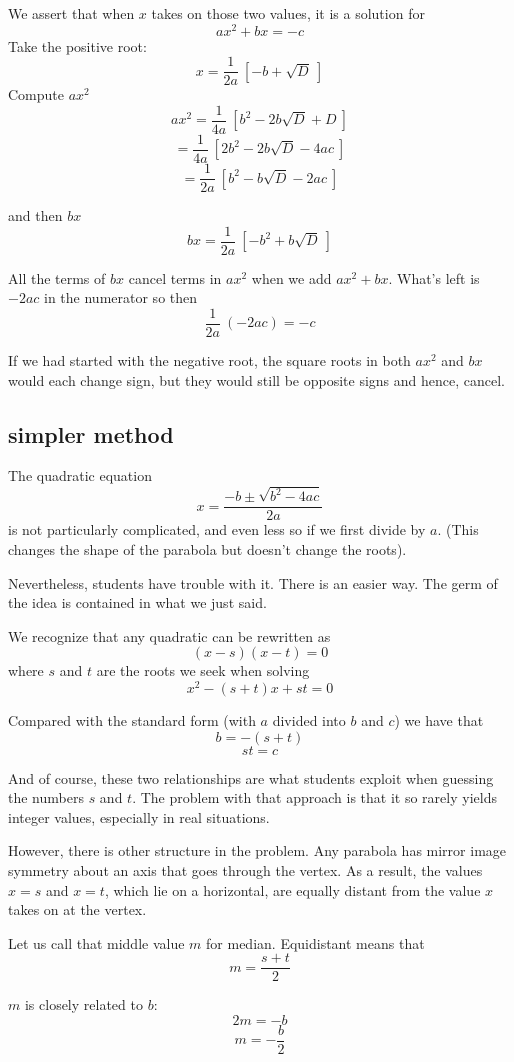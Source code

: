 \documentclass[11pt, oneside]{article}
\begin{document}
We assert that when $x$ takes on those two values, it is a solution for
\[ ax^2 + bx = -c \]
Take the positive root:
\[ x = \frac{1}{2a} \ [ -b + \sqrt{D} \ ] \]
Compute $ax^2$
\[ ax^2 = \frac{1}{4a} \ [ b^2 - 2 b \sqrt{D} + D \ ] \]
\[ = \frac{1}{4a} \ [ 2b^2 - 2b \sqrt{D} - 4ac \ ] \]
\[ =  \frac{1}{2a} \ [ b^2 - b \sqrt{D} - 2ac \ ] \]

and then $bx$
\[ bx = \frac{1}{2a} \ [ -b^2 + b \sqrt{D} \ ] \]

All the terms of $bx$ cancel terms in $ax^2$ when we add $ax^2 + bx$.  What's left is $- 2ac$ in the numerator so then
\[ \frac{1}{2a} \ (- 2ac) = -c \]

If we had started with the negative root, the square roots in both $ax^2$ and $bx$ would each change sign, but they would still be opposite signs and hence, cancel.

\subsection*{simpler method}
The quadratic equation
\[ x =  \frac{-b \pm \sqrt{b^2 - 4ac}}{2a}  \]
is not particularly complicated, and even less so if we first divide by $a$.  (This changes the shape of the parabola but doesn't change the roots).

Nevertheless, students have trouble with it.  There is an easier way.  The germ of the idea is contained in what we just said.

We recognize that any quadratic can be rewritten as
\[ (x - s)(x - t) = 0 \]
where $s$ and $t$ are the roots we seek when solving
\[ x^2 - (s + t) x + st = 0 \]

Compared with the standard form (with $a$ divided into $b$ and $c$) we have that
\[ b = - (s + t) \]
\[ st = c \]

And of course, these two relationships are what students exploit when guessing the numbers $s$ and $t$.  The problem with that approach is that it so rarely yields integer values, especially in real situations.

However, there is other structure in the problem.  Any parabola has mirror image symmetry about an axis that goes through the vertex.  As a result, the values $x = s$ and $x = t$, which lie on a horizontal, are equally distant from the value $x$ takes on at the vertex.  

Let us call that middle value $m$ for median.  Equidistant means that
\[ m = \frac{s + t}{2} \]

$m$ is closely related to $b$:
\[ 2m = - b \]
\[ m = - \frac{b}{2} \]
\end{document}
